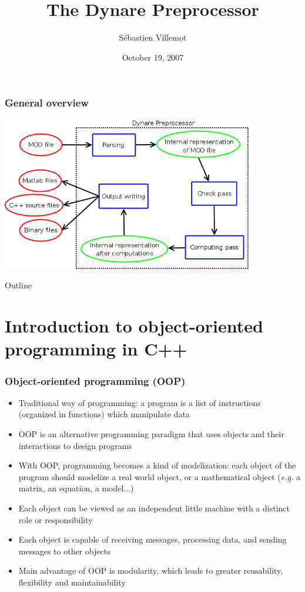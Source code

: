 \documentclass{beamer}
\title{The Dynare Preprocessor}
\author[S. Villemot]{Sébastien Villemot}
\institute{CEPREMAP}
\date{October 19, 2007}
\begin{document}
\begin{frame}
  \titlepage
\end{frame}

\begin{frame}
  \frametitle{General overview}
  \begin{center}
    \includegraphics[width=11cm]{overview.png}
  \end{center}
\end{frame}

\begin{frame}{Outline}
  \tableofcontents
\end{frame}

\section{Introduction to object-oriented programming in C++}

\begin{frame}
  \frametitle{Object-oriented programming (OOP)}
  \begin{itemize}
  \item Traditional way of programming: a program is a list of instructions (organized in functions) which manipulate data
  \item OOP is an alternative programming paradigm that uses \alert{objects} and their interactions to design programs
    \pause
  \item With OOP, programming becomes a kind of modelization: each object of the program should modelize a real world object, or a mathematical object (\textit{e.g.} a matrix, an equation, a model...)
  \item Each object can be viewed as an independent little machine with a distinct role or responsibility
  \item Each object is capable of receiving messages, processing data, and sending messages to other objects
    \pause
  \item Main advantage of OOP is \alert{modularity}, which leads to greater reusability, flexibility and maintainability
  \end{itemize}
\end{frame}
\end{document}
